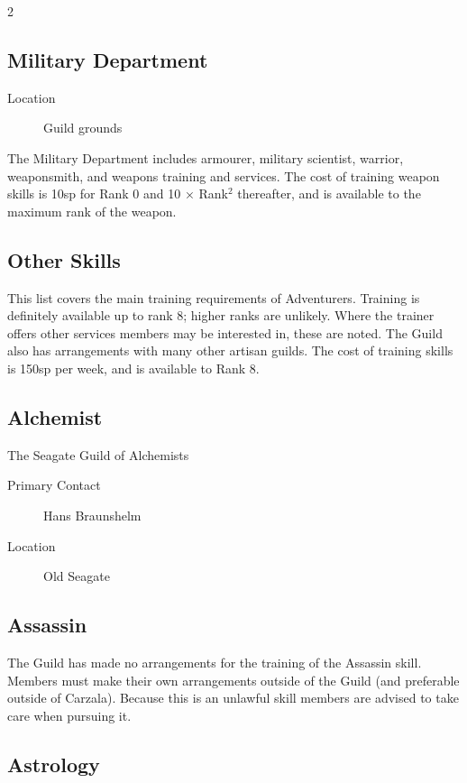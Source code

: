 \begin{multicols}{2}

\subsection{Military Department}

\begin{description}
\item[Location] Guild grounds
\end{description}

The Military Department includes armourer,
military scientist, warrior, weaponsmith, and weapons training and
services. The cost of training weapon skills is 10sp for Rank 0 and 10
× Rank$^2$ thereafter, and is available to the maximum rank of the
weapon.

\subsection{Other Skills}

This list covers the main training requirements of Adventurers.
Training is definitely available up to rank 8; higher ranks are
unlikely. Where the trainer offers other services members may be
interested in, these are noted. The Guild also has arrangements with
many other artisan guilds.  The cost of training skills is 150sp per
week, and is available to Rank 8.

\subsection{Alchemist}

The Seagate Guild of Alchemists
\begin{description}
\item[Primary Contact] Hans Braunshelm
\item[Location] Old Seagate
\end{description}

\subsection{Assassin}

The Guild has made no arrangements for the training of the Assassin
skill. Members must make their own arrangements outside of the Guild
(and preferable outside of Carzala).  Because this is an unlawful
skill members are advised to take care when pursuing it.

\subsection{Astrology}


\end{multicols}
